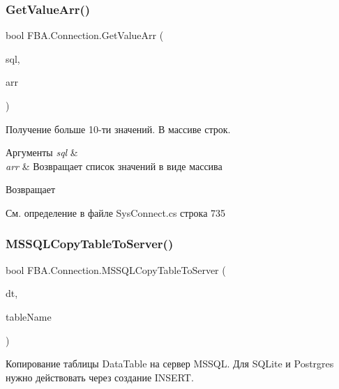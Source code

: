 \subsubsection{\texorpdfstring{Get\+Value\+Arr()}{GetValueArr()}}
{\footnotesize\ttfamily bool F\+B\+A.\+Connection.\+Get\+Value\+Arr (\begin{DoxyParamCaption}\item[{string}]{sql,  }\item[{ref string \mbox{[}$\,$\mbox{]}}]{arr }\end{DoxyParamCaption})}



Получение больше 10-\/ти значений. В массиве строк. 


\begin{DoxyParams}{Аргументы}
{\em sql} & \\
\hline
{\em arr} & Возвращает список значений в виде массива\\
\hline
\end{DoxyParams}
\begin{DoxyReturn}{Возвращает}

\end{DoxyReturn}


См. определение в файле Sys\+Connect.\+cs строка 735

\mbox{\label{class_f_b_a_1_1_connection_a2639fc83e1f04830b26312cdd19b5948}} 
\subsubsection{\texorpdfstring{M\+S\+S\+Q\+L\+Copy\+Table\+To\+Server()}{MSSQLCopyTableToServer()}}
{\footnotesize\ttfamily bool F\+B\+A.\+Connection.\+M\+S\+S\+Q\+L\+Copy\+Table\+To\+Server (\begin{DoxyParamCaption}\item[{\mbox{\hyperlink{_sys_static_8cs_a6542cfcff2f8e81f06ade15aa0bfe2b7}{System.\+Data.\+Data\+Table}}}]{dt,  }\item[{string}]{table\+Name }\end{DoxyParamCaption})}



Копирование таблицы Data\+Table на сервер M\+S\+S\+QL. Для S\+Q\+Lite и Postrgres нужно действовать через создание I\+N\+S\+E\+RT. 


